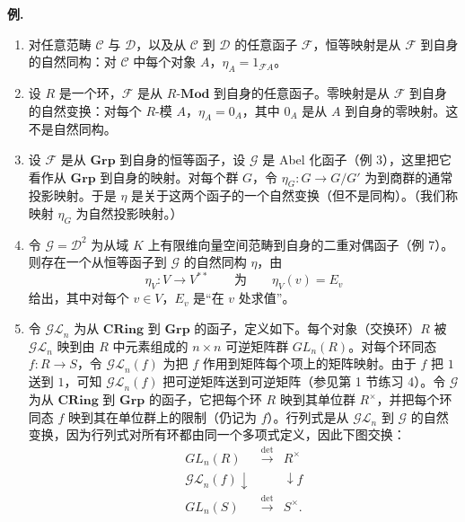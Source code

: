 \noindent\textbf{例.}
\begin{enumerate}[label=(\arabic*)]
  \item 对任意范畴 $\mathcal C$ 与 $\mathcal D$，以及从 $\mathcal C$ 到 $\mathcal D$ 的任意函子 $\mathcal F$，恒等映射是从 $\mathcal F$ 到自身的自然同构：对 $\mathcal C$ 中每个对象 $A$，$\eta_A=1_{\mathcal F A}$。

  \item 设 $R$ 是一个环，$\mathcal F$ 是从 $R\text{-}\mathbf{Mod}$ 到自身的任意函子。零映射是从 $\mathcal F$ 到自身的自然变换：对每个 $R$-模 $A$，$\eta_A=0_A$，其中 $0_A$ 是从 $A$ 到自身的零映射。这不是自然同构。

  \item 设 $\mathcal F$ 是从 $\mathbf{Grp}$ 到自身的恒等函子，设 $\mathcal G$ 是 Abel 化函子（例 3），这里把它看作从 $\mathbf{Grp}$ 到自身的映射。对每个群 $G$，令 $\eta_G:G\to G/G'$ 为到商群的通常投影映射。于是 $\eta$ 是关于这两个函子的一个自然变换（但不是同构）。（我们称映射 $\eta_G$ 为自然投影映射。）

  \item 令 $\mathcal G=\mathcal D^2$ 为从域 $K$ 上有限维向量空间范畴到自身的二重对偶函子（例 7）。则存在一个从恒等函子到 $\mathcal G$ 的自然同构 $\eta$，由
  \[
    \eta_V:V\longrightarrow V^{**}\qquad\text{为}\qquad \eta_V(v)=E_v
  \]
  给出，其中对每个 $v\in V$，$E_v$ 是“在 $v$ 处求值”。

  \item 令 $\mathcal{GL}_n$ 为从 $\mathbf{CRing}$ 到 $\mathbf{Grp}$ 的函子，定义如下。每个对象（交换环）$R$ 被 $\mathcal{GL}_n$ 映到由 $R$ 中元素组成的 $n\times n$ 可逆矩阵群 $GL_n(R)$。对每个环同态 $f:R\to S$，令 $\mathcal{GL}_n(f)$ 为把 $f$ 作用到矩阵每个项上的矩阵映射。由于 $f$ 把 $1$ 送到 $1$，可知 $\mathcal{GL}_n(f)$ 把可逆矩阵送到可逆矩阵（参见第 1 节练习 4）。令 $\mathcal G$ 为从 $\mathbf{CRing}$ 到 $\mathbf{Grp}$ 的函子，它把每个环 $R$ 映到其单位群 $R^\times$，并把每个环同态 $f$ 映到其在单位群上的限制（仍记为 $f$）。行列式是从 $\mathcal{GL}_n$ 到 $\mathcal G$ 的自然变换，因为行列式对所有环都由同一个多项式定义，因此下图交换：
  \[
  \begin{array}{ccc}
  GL_n(R) & \xrightarrow{\det} & R^\times\\
  \mathcal{GL}_n(f)\downarrow && \downarrow f\\
  GL_n(S) & \xrightarrow{\det} & S^\times.
  \end{array}
  \]
\end{enumerate}

